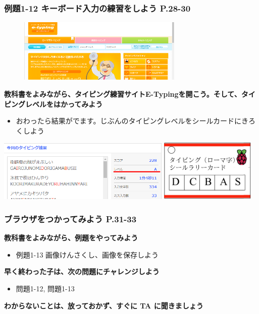 \documentclass[dvipdfmx]{beamer}
\begin{document}
\begin{frame}[fragile]
	\frametitle{例題1-12 キーボード入力の練習をしよう P.28-30~~~}
  \begin{figure}
    \centering
    \includegraphics[width=0.7\textwidth]{slide02_010.png}
  \end{figure}
  \vfill
  \large\textbf{教科書をよみながら、タイピング練習サイトE-Typingを開こう。そして、タイピングレベルをはかってみよう}
  \begin{itemize}
    \item おわったら結果がでます。じぶんのタイピングレベルをシールカードにきろくしよう
  \end{itemize}
  \includegraphics[width=0.62\textwidth]{slide02_012.png}
  \hfill
  \includegraphics[width=0.34\textwidth]{slide02_011.png}
\end{frame}


\begin{frame}[fragile]
	\frametitle{ブラウザをつかってみよう P.31-33~~~}
    \large\textbf{教科書をよみながら、例題をやってみよう}
    				\begin{itemize}
    					\item 例題1-13 画像けんさくし、画像を保存しよう
    				\end{itemize}
          \vfill
          \large\textbf{早く終わった子は、次の問題にチャレンジしよう}
          \begin{itemize}
            \item 問題1-12, 問題1-13
          \end{itemize}
          \vfill
          \large\textbf{わからないことは、放っておかず、すぐに TA に聞きましょう}
\end{frame}
\end{document}
